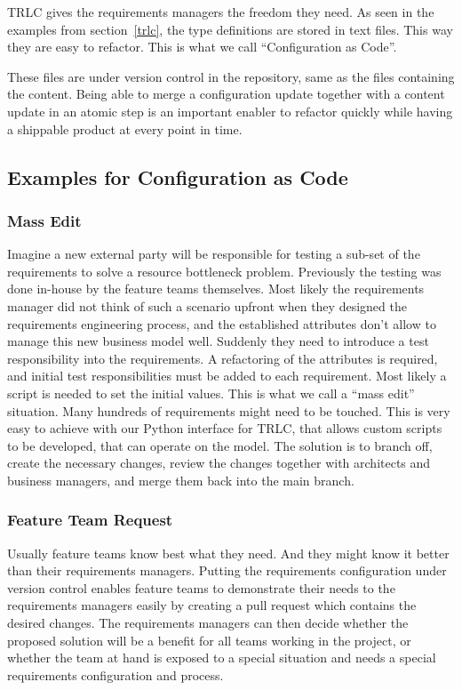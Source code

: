\documentclass[english]{lni}
\begin{document}
TRLC gives the requirements managers the freedom they need.  As seen
in the examples from section~\ref{trlc}, the type definitions are
stored in text files.  This way they are easy to refactor.  This is
what we call ``Configuration as Code''.

These files are under version control in the repository, same as the
files containing the content. Being able to merge a configuration
update together with a content update in an atomic step is an
important enabler to refactor quickly while having a shippable product
at every point in time.

\subsection{Examples for Configuration as Code}

\subsubsection{Mass Edit}
Imagine a new external party will be responsible for testing a sub-set
of the requirements to solve a resource bottleneck problem.
Previously the testing was done in-house by the feature teams
themselves.  Most likely the requirements manager did not think of
such a scenario upfront when they designed the requirements
engineering process, and the established attributes don't allow to
manage this new business model well.  Suddenly they need to introduce
a test responsibility into the requirements.  A refactoring of the
attributes is required, and initial test responsibilities must be
added to each requirement.  Most likely a script is needed to set the
initial values.  This is what we call a ``mass edit'' situation.  Many
hundreds of requirements might need to be touched.  This is very easy
to achieve with our Python interface for TRLC, that allows custom
scripts to be developed, that can operate on the model.  The solution
is to branch off, create the necessary changes, review the changes
together with architects and business managers, and merge them back
into the main branch.

\subsubsection{Feature Team Request}
Usually feature teams know best what they need.  And they might know
it better than their requirements managers.  Putting the requirements
configuration under version control enables feature teams to
demonstrate their needs to the requirements managers easily by
creating a pull request which contains the desired changes.  The
requirements managers can then decide whether the proposed solution
will be a benefit for all teams working in the project, or whether the
team at hand is exposed to a special situation and needs a special
requirements configuration and process.
\end{document}
